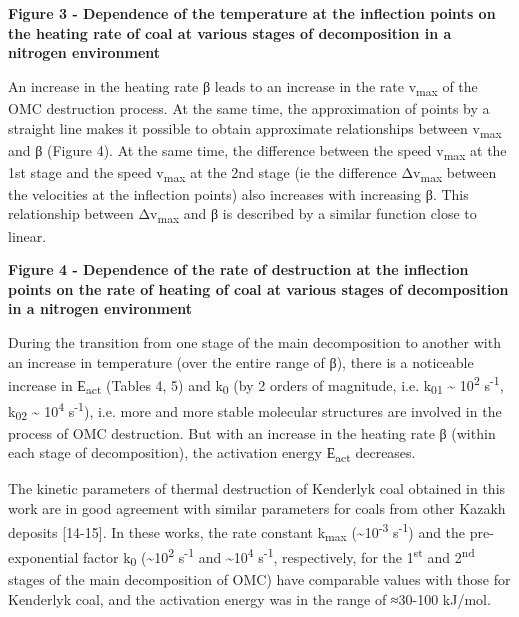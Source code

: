 {\bfseries Figure 3 - Dependence of the temperature at the inflection
points on the heating rate of coal at various stages of decomposition in
a nitrogen environment}

An increase in the heating rate β leads to an increase in the rate
v\textsubscript{max} of the OMC destruction process. At the same time,
the approximation of points by a straight line makes it possible to
obtain approximate relationships between v\textsubscript{max} and β
(Figure 4). At the same time, the difference between the speed
v\textsubscript{max} at the 1st stage and the speed v\textsubscript{max}
at the 2nd stage (ie the difference Δv\textsubscript{max} between the
velocities at the inflection points) also increases with increasing β.
This relationship between Δv\textsubscript{max} and β is described by a
similar function close to linear.

{\bfseries Figure 4 - Dependence of the rate of destruction at the
inflection points on the rate of heating of coal at various stages of
decomposition in a nitrogen environment}

During the transition from one stage of the main decomposition to
another with an increase in temperature (over the entire range of β),
there is a noticeable increase in Е\textsubscript{act} (Tables 4, 5) and
k\textsubscript{0} (by 2 orders of magnitude, i.e. k\textsubscript{01}
\textasciitilde{} 10\textsuperscript{2} s\textsuperscript{-1},
k\textsubscript{02} \textasciitilde{} 10\textsuperscript{4}
s\textsuperscript{-1}), i.e. more and more stable molecular structures
are involved in the process of OMC destruction. But with an increase in
the heating rate β (within each stage of decomposition), the activation
energy Е\textsubscript{act} decreases.

The kinetic parameters of thermal destruction of Kenderlyk coal obtained
in this work are in good agreement with similar parameters for coals
from other Kazakh deposits {[}14-15{]}. In these works, the rate
constant k\textsubscript{max} (\textasciitilde10\textsuperscript{-3}
s\textsuperscript{-1}) and the pre-exponential factor k\textsubscript{0}
(\textasciitilde10\textsuperscript{2} s\textsuperscript{-1} and
\textasciitilde10\textsuperscript{4} s\textsuperscript{-1},
respectively, for the 1\textsuperscript{st} and 2\textsuperscript{nd}
stages of the main decomposition of OMC) have comparable values with
those for Kenderlyk coal, and the activation energy was in the range of
≈30-100 kJ/mol.

